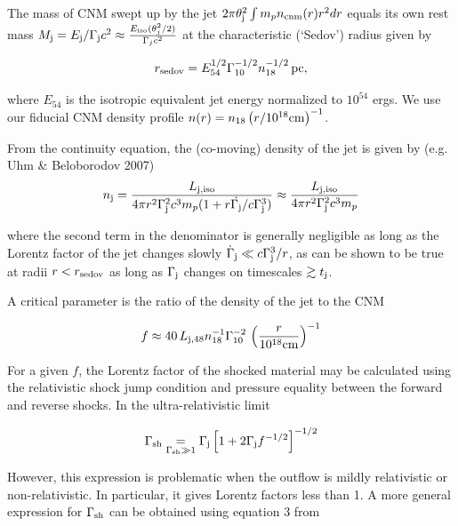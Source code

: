 \documentclass[usenatbib,fleqn]{mnras}
\begin{document}
The mass of CNM swept up by the jet $2\pi\theta_{\rm j}^{2}\int m_p
n_{\rm cnm}(r) r^{2}dr$ equals its own rest mass $M_{\rm j} = E_{\rm
  j}/\Gamma_{\rm j}c^{2} \approx \frac{E_{\rm iso}
  (\theta_j^2/2)}{\Gamma_j c^2} $ at the characteristic (`Sedov')
radius given by

\begin{equation}
r_{\rm sedov} = E_{54}^{1/2} \Gamma_{10}^{-1/2} n_{\rm 18}^{-1/2}\,{\rm pc}, 
\end{equation}

where $E_{54}$ is the isotropic equivalent jet energy normalized to
$10^{54}$ ergs. We use our fiducial CNM density profile $n(r)=n_{18}
\left(r/10^{18} {\rm cm}\right)^{-1}$.

From the continuity equation, the (co-moving) density of the jet is
given by (e.g. Uhm \& Beloborodov 2007)
 \begin{align}
   n_{\rm j} =  \frac{L_{\rm j, iso}}{4 \pi r^{2}\Gamma_{\rm
       j}^{2}c^{3}m_p(1 + r \dot{\Gamma_{\rm j}}/c\Gamma_{\rm j}^{3})}
   \approx  \frac{L_{\rm j, iso}}{4 \pi r^{2}\Gamma_{\rm j}^{2}c^{3}m_p}
\end{align}

where the second term in the denominator is generally negligible as
long as the Lorentz factor of the jet changes slowly
$\dot{\Gamma}_{\rm j} \ll c\Gamma_{\rm j}^{3}/r$, as can be shown to
be true at radii $r < r_{\rm sedov}$ as long as $\Gamma_{\rm j}$
changes on timescales $\gtrsim t_{\rm j}$.

A critical parameter is the ratio of the density of the jet to the
CNM

\begin{equation}
  f\approx 40\,  L_{\rm j,48} n_{18}^{-1} \Gamma_{10}^{-2} \, \left(\frac{r}{10^{18} {\rm
        cm}}\right)^{-1} 
\end{equation}

For a given $f$, the Lorentz factor of the shocked material may be
calculated using the relativistic shock jump condition and pressure
equality between the forward and reverse shocks. In the
ultra-relativistic limit

\begin{equation}
\Gamma_{\rm sh} \underset{\Gamma_{\rm sh} \gg 1}= \Gamma_{\rm j}\left[1 + 2\Gamma_{\rm j}f^{-1/2}\right]^{-1/2}
\end{equation}

However, this expression is problematic when the outflow is mildly
relativistic or non-relativistic. In particular, it gives Lorentz
factors less than 1. A more general expression for $\Gamma_{\rm sh}$
can be obtained using equation 3 from \citet{Beloborodov&Uhm2006}
\end{document}
